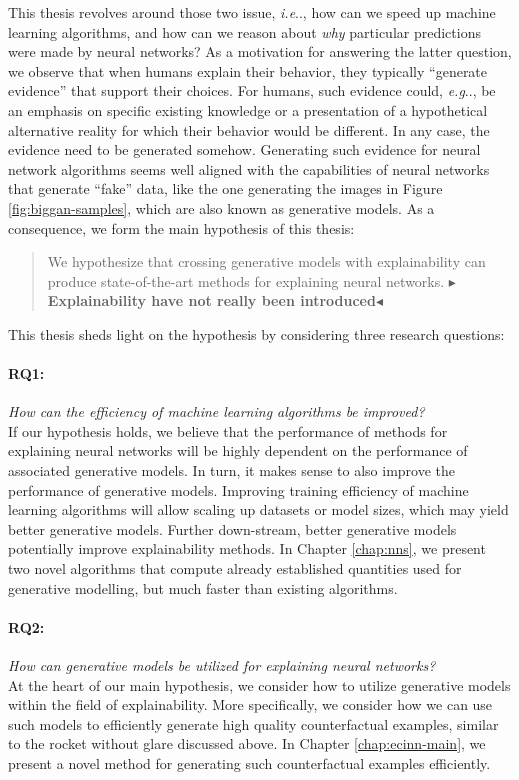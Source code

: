 \documentclass[11pt,a4paper,twoside,openright,final]{memoir}
\makeatletter
\def\ifdraft{\ifdim\overfullrule>\z@
  \expandafter\@firstoftwo\else\expandafter\@secondoftwo\fi}
\newcommand{\todo}[1]{{
    \ifdraft{
        \color[rgb]{.5,0,0}\textbf{
            $\blacktriangleright$#1$\blacktriangleleft$
         }
    }{}}}
\DeclareRobustCommand\onedot{\futurelet\@let@token\@onedot}
\def\@onedot{\ifx\@let@token.\else.\null\fi\xspace}
\def\eg{\emph{e.g}\onedot} \def\Eg{\emph{E.g}\onedot}
\def\ie{\emph{i.e}\onedot} \def\Ie{\emph{I.e}\onedot}
\makeatother
\begin{document}
This thesis revolves around those two issue, \ie, how can we speed up machine learning algorithms, and how can we reason about \emph{why} particular predictions were made by neural networks? 
As a motivation for answering the latter question, we observe that when humans explain their behavior, they typically ``generate evidence'' that support their choices.
For humans, such evidence could, \eg, be an emphasis on specific existing knowledge or a presentation of a hypothetical alternative reality for which their behavior would be different.
In any case, the evidence need to be generated somehow.
Generating such evidence for neural network algorithms seems well aligned with the capabilities of neural networks that generate ``fake'' data, like the one generating the images in Figure \ref{fig:biggan-samples}, which are also known as generative models. 
As a consequence, we form the main hypothesis of this thesis:
%
\begin{quote}
    We hypothesize that crossing generative models with explainability can produce state-of-the-art methods for explaining neural networks. 
    \todo{Explainability have not really been introduced}
\end{quote}
%
This thesis sheds light on the hypothesis by considering three research questions:
\paragraph{RQ1:} \emph{How can the efficiency of machine learning algorithms be improved?}\\
If our hypothesis holds, we believe that the performance of methods for explaining neural networks will be highly dependent on the performance of associated generative models. 
In turn, it makes sense to also improve the performance of generative models.
Improving training efficiency of machine learning algorithms will allow scaling up datasets or model sizes, which may yield better generative models. 
Further down-stream, better generative models potentially improve explainability methods.
In Chapter \ref{chap:nns}, we present two novel algorithms that compute already established quantities used for generative modelling, but much faster than existing algorithms.  

\paragraph{RQ2:} \emph{How can generative models be utilized for explaining neural networks?}\\
At the heart of our main hypothesis, we consider how to utilize generative models within the field of explainability.
More specifically, we consider how we can use such models to efficiently generate high quality counterfactual examples, similar to the rocket without glare discussed above.
In Chapter \ref{chap:ecinn-main}, we present a novel method for generating such counterfactual examples efficiently.
\end{document}
